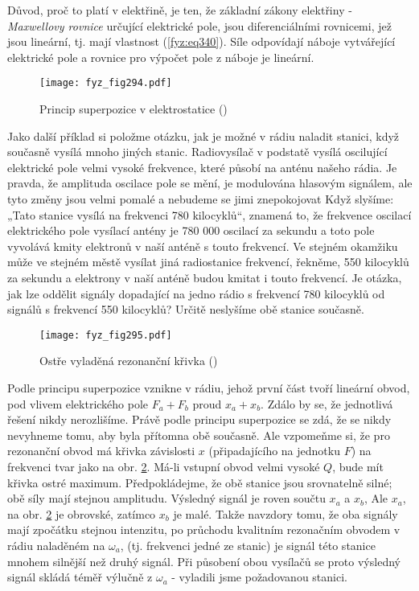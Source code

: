 {    Důvod, proč to platí v elektřině, je ten, že základní zákony elektřiny - \emph{Maxwellovy 
    rovnice} určující elektrické pole, jsou diferenciálními rovnicemi, jež jsou lineární, tj. mají 
    vlastnost (\ref{fyz:eq340}). Síle odpovídají náboje vytvářející elektrické pole a rovnice pro 
    výpočet pole z náboje je lineární. 

    \begin{figure}[ht!] %
      \centering
      \texttt{[image: fyz\_fig294.pdf]}
      \caption{Princip superpozice v elektrostatice
               (\cite[s.~335]{Feynman01})}
      \label{fyz:fig294}
    \end{figure}
    
    Jako další příklad si položme otázku, jak je možné v rádiu naladit stanici, když současně 
    vysílá mnoho jiných stanic. Radiovysílač v podstatě vysílá oscilující elektrické pole velmi 
    vysoké frekvence, které působí na anténu našeho rádia. Je pravda, že amplituda oscilace pole se 
    mění, je modulována hlasovým signálem, ale tyto změny jsou velmi pomalé a nebudeme se jimi 
    znepokojovat Když slyšíme: „Tato stanice vysílá na frekvenci 780 kilocyklů“, znamená to, že 
    frekvence oscilací elektrického pole vysílací antény je 780 000 oscilací za sekundu a toto pole 
    vyvolává kmity elektronů v naší anténě s touto frekvencí. Ve stejném okamžiku může ve stejném 
    městě vysílat jiná radiostanice frekvencí, řekněme, 550 kilocyklů za sekundu a elektrony v naší 
    anténě budou kmitat i touto frekvencí. Je otázka, jak lze oddělit signály dopadající na jedno 
    rádio s frekvencí 780 kilocyklů od signálů s frekvencí 550 kilocyklů? Určitě neslyšíme obě 
    stanice současně. 
    
    \begin{figure}[ht!] %
      \centering
      \texttt{[image: fyz\_fig295.pdf]}
      \caption{Ostře vyladěná rezonanční křivka
               (\cite[s.~335]{Feynman01})}
      \label{fyz:fig295}
    \end{figure}
    
    Podle principu superpozice vznikne v rádiu, jehož první část tvoří lineární obvod, pod vlivem 
    elektrického pole \(F_a + F_b\) proud \(x_a + x_b\). Zdálo by se, že jednotlivá řešení nikdy 
    nerozlišíme. Právě podle principu superpozice se zdá, že se nikdy nevyhneme tomu, aby byla 
    přítomna obě současně. Ale vzpomeňme si, že pro rezonanční obvod má křivka závislosti \(x\) 
    (připadajícího na jednotku \(F\)) na frekvenci tvar jako na obr. \ref{fyz:fig295}. Má-li 
    vstupní obvod velmi vysoké \(Q\), bude mít křivka ostré maximum. Předpokládejme, že obě stanice 
    jsou srovnatelně silné; obě síly mají stejnou amplitudu. Výsledný signál je roven součtu 
    \(x_a\) a \(x_b\), Ale \(x_a\), na obr. \ref{fyz:fig295} je obrovské, zatímco \(x_b\) je malé. 
    Takže navzdory tomu, že oba signály mají zpočátku stejnou intenzitu, po průchodu kvalitním 
    rezonačním obvodem v rádiu naladěném na \(\omega_a\), (tj. frekvenci jedné ze stanic) je signál 
    této stanice mnohem silnější než druhý signál. Při působení obou vysílačů se proto výsledný 
    signál skládá téměř výlučně z \(\omega_a\) - vyladili jsme požadovanou stanici.
    
}
